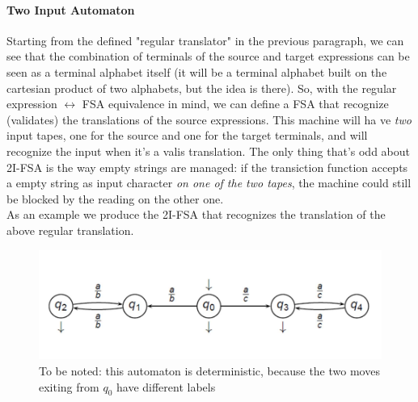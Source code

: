 				\paragraph{Two Input Automaton}
					Starting from the defined "regular translator" in the previous paragraph, we can see that the combination of terminals of the source and target expressions can be seen as a terminal alphabet itself (it will be a terminal alphabet built on the cartesian product of two alphabets, but the idea is there). So, with the regular expression $\leftrightarrow$ FSA equivalence in mind, we can define a FSA that recognize (validates) the translations of the source expressions. This machine will ha ve \emph{two} input tapes, one for the source and one for the target terminals, and will recognize the input when it's a valis translation. The only thing that's odd about 2I-FSA is the way empty strings are managed: if the transiction function accepts a empty string as input character \emph{on one of the two tapes}, the machine could still be blocked by the reading on the other one.\\
					As an example we produce the 2I-FSA that recognizes the translation of the above regular translation.
					\begin{figure}[H]
						\centering
						\includegraphics[width = \textwidth]{./images/2IFSA.png}
						\caption{To be noted: this automaton is deterministic, because the two moves exiting from $q_0$ have different labels}
					\end{figure}
					
